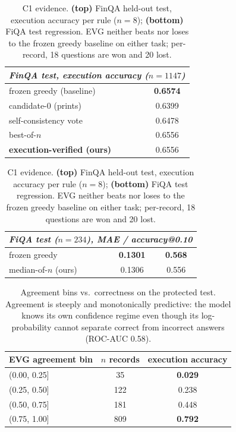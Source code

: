 \documentclass[10pt]{article}
\begin{document}
\begin{table}[t]
\centering
\caption{\label{tab:c1} C1 evidence. \textbf{(top)} FinQA held-out test, execution accuracy
per rule ($n{=}8$); \textbf{(bottom)} FiQA test regression. EVG neither beats nor loses to
the frozen greedy baseline on either task; per-record, 18 questions are won and 20 lost.}
\small
\begin{tabular}{lc}
\toprule
\multicolumn{2}{l}{\emph{FinQA test, execution accuracy ($n{=}1147$)}}\\
\midrule
frozen greedy (baseline) & \textbf{0.6574}\\
candidate-0 (prints) & 0.6399\\
self-consistency vote & 0.6478\\
best-of-$n$ & 0.6556\\
\textbf{execution-verified (ours)} & 0.6556\\
\bottomrule
\end{tabular}
\vspace{0.5em}
\begin{tabular}{lcc}
\toprule
\multicolumn{3}{l}{\emph{FiQA test ($n{=}234$), MAE / accuracy@0.10}}\\
\midrule
frozen greedy & \textbf{0.1301} & \textbf{0.568}\\
median-of-$n$ (ours) & 0.1306 & 0.556\\
\bottomrule
\end{tabular}
\end{table}

\begin{table}[t]
\centering
\caption{\label{tab:agreement} Agreement bins vs.\ correctness on the protected test.
Agreement is steeply and monotonically predictive: the model knows its own confidence
regime even though its log-probability cannot separate correct from incorrect answers
(ROC-AUC 0.58).}
\small
\begin{tabular}{lcc}
\toprule
EVG agreement bin & $n$ records & execution accuracy\\
\midrule
(0.00, 0.25] & 35 & \textbf{0.029}\\
(0.25, 0.50] & 122 & 0.238\\
(0.50, 0.75] & 181 & 0.448\\
(0.75, 1.00] & 809 & \textbf{0.792}\\
\bottomrule
\end{tabular}
\end{table}
\end{document}
